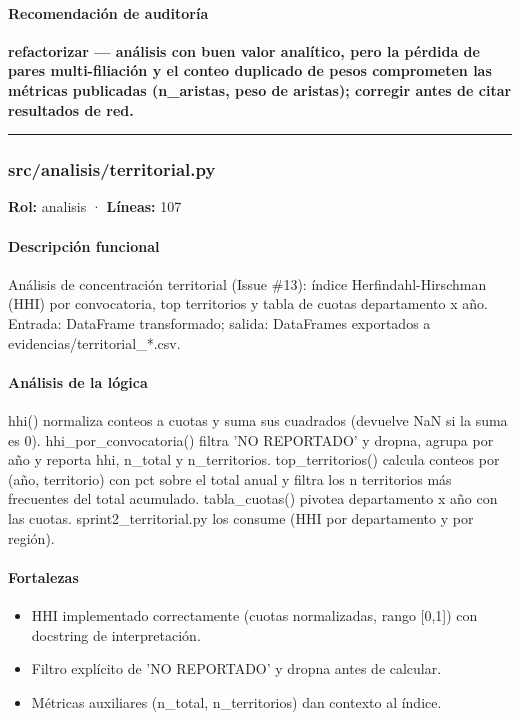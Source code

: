 \paragraph{Recomendación de auditoría}
\textbf{refactorizar --- análisis con buen valor analítico, pero la pérdida de pares multi-filiación y el conteo duplicado de pesos comprometen las métricas publicadas (n\_aristas, peso de aristas); corregir antes de citar resultados de red.}

\medskip
\hrule

\subsubsection{src/analisis/territorial.py}
\textbf{Rol:} analisis · \textbf{Líneas:} 107

\paragraph{Descripción funcional}
Análisis de concentración territorial (Issue \#13): índice Herfindahl-Hirschman (HHI) por convocatoria, top territorios y tabla de cuotas departamento x año. Entrada: DataFrame transformado; salida: DataFrames exportados a evidencias/territorial\_*.csv.

\paragraph{Análisis de la lógica}
hhi() normaliza conteos a cuotas y suma sus cuadrados (devuelve NaN si la suma es 0). hhi\_por\_convocatoria() filtra 'NO REPORTADO' y dropna, agrupa por año y reporta hhi, n\_total y n\_territorios. top\_territorios() calcula conteos por (año, territorio) con pct sobre el total anual y filtra los n territorios más frecuentes del total acumulado. tabla\_cuotas() pivotea departamento x año con las cuotas. sprint2\_territorial.py los consume (HHI por departamento y por región).

\paragraph{Fortalezas}
\begin{itemize}
  \item HHI implementado correctamente (cuotas normalizadas, rango [0,1]) con docstring de interpretación.
  \item Filtro explícito de 'NO REPORTADO' y dropna antes de calcular.
  \item Métricas auxiliares (n\_total, n\_territorios) dan contexto al índice.
\end{itemize}

